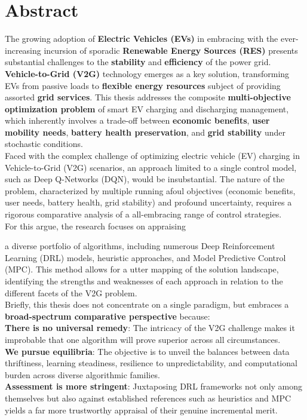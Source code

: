 \section*{Abstract}
The growing adoption of \textbf{Electric Vehicles (EVs)} in embracing with the ever-increasing incursion of sporadic \textbf{Renewable Energy Sources (RES)} presents substantial challenges to the \textbf{stability} and \textbf{efficiency} of the power grid. \textbf{Vehicle-to-Grid (V2G)} technology emerges as a key solution, transforming EVs from passive loads to \textbf{flexible energy resources} subject of providing assorted \textbf{grid services}. This thesis addresses the composite \textbf{multi-objective optimization problem} of smart EV charging and discharging management, which inherently involves a trade-off between \textbf{economic benefits}, \textbf{user mobility needs}, \textbf{battery health preservation}, and \textbf{grid stability} under stochastic conditions.
\\
Faced with the complex challenge of optimizing electric vehicle (EV) charging in Vehicle-to-Grid (V2G) scenarios, an approach limited to a single control model, such as Deep Q-Networks (DQN), would be insubstantial. The nature of the problem, characterized by multiple running afoul objectives (economic benefits, user needs, battery health, grid stability) and profound uncertainty, requires a rigorous comparative analysis of a all-embracing range of control strategies.
\\
For this argue, the research focuses on appraising \begin{comment} evaluating
\end{comment}
a diverse portfolio of algorithms, including numerous Deep Reinforcement Learning (DRL) models, heuristic approaches, and Model Predictive Control (MPC). This method allows for a utter mapping of the solution landscape, identifying the strengths and weaknesses of each approach in relation to the different facets of the V2G problem.
\\
Briefly, this thesis does not concentrate on a single paradigm, but embraces a \textbf{broad-spectrum comparative perspective} because:
\\
\textbf{There is no universal remedy}: The intricacy of the V2G challenge makes it improbable that one algorithm will prove superior across all circumstances.
\\
\textbf{We pursue equilibria}: The objective is to unveil the balances between data thriftiness, learning steadiness, resilience to unpredictability, and computational burden across diverse algorithmic families.
\\
\textbf{Assessment is more stringent}: Juxtaposing DRL frameworks not only among themselves but also against established references such as heuristics and MPC yields a far more trustworthy appraisal of their genuine incremental merit.
\\


